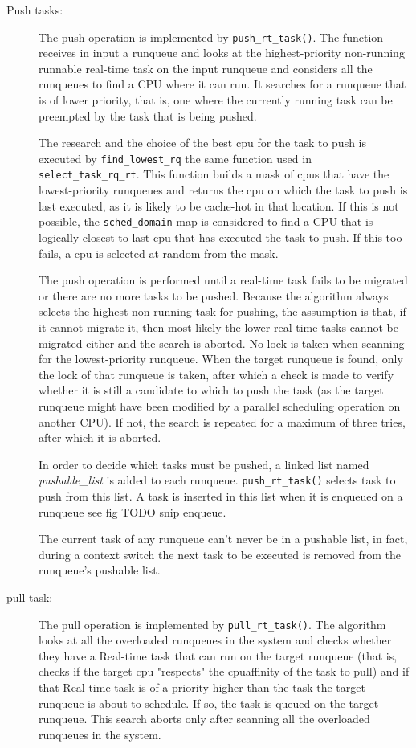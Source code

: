 \begin{description}
\item[Push tasks:] The push operation is implemented by \texttt{push\_rt\_task()}. The function receives in input a runqueue and looks at the 
highest-priority non-running runnable real-time task on the input runqueue and considers all the runqueues to find a CPU where it can run. It searches for 
a runqueue that is of lower priority, that is, one where the currently running task can be preempted by the task that is being pushed. 

The research and the choice of the best cpu for the task to push is executed by \texttt{find\_lowest\_rq} the same function used in 
\texttt{select\_task\_rq\_rt}. This function builds a mask of cpus that have the lowest-priority runqueues and returns the cpu on which the task to push is 
last executed, as it is likely to be cache-hot in that location. If this is not possible, the \texttt{sched\_domain} map is considered to find a CPU that 
is logically closest to last cpu that has executed the task to push. If this too fails, a cpu is selected at random from the mask.

The push operation is performed until a real-time task fails to be migrated or there are no more tasks to be pushed. Because the algorithm always selects 
the highest non-running task for pushing, the assumption is that, if it cannot migrate it, then most likely the lower real-time tasks cannot be migrated 
either and the search is aborted. No lock is taken when scanning for the lowest-priority runqueue. When the target runqueue is found, only the lock of that 
runqueue is taken, after which a check is made to verify whether it is still a candidate to which to push the task (as the target runqueue might have been 
modified by a parallel scheduling operation on another CPU). If not, the search is repeated for a maximum of three tries, after which it is aborted. 

In order to decide which tasks must be pushed, a linked list named \textit{pushable\_list} is added to each runqueue. \texttt{push\_rt\_task()} selects task
to push from this list. A task is inserted in this list when it is enqueued on a runqueue see fig TODO snip enqueue. 

The current task of any runqueue can't never be in a pushable list, in fact, during a context switch the next task to be executed is removed from the 
runqueue's pushable list.

\item[pull task:] The pull operation is implemented by \texttt{pull\_rt\_task()}. The algorithm looks at all the overloaded runqueues in the system 
and checks whether they have a Real-time task that can run on the target runqueue (that is, checks if the target cpu "respects" the cpuaffinity of the 
task to pull) and if that Real-time task is of a priority higher than the task the target runqueue is about to schedule. If so, the task is queued on 
the target runqueue. This search aborts only after scanning all the overloaded runqueues in the system. 

\end{description}

